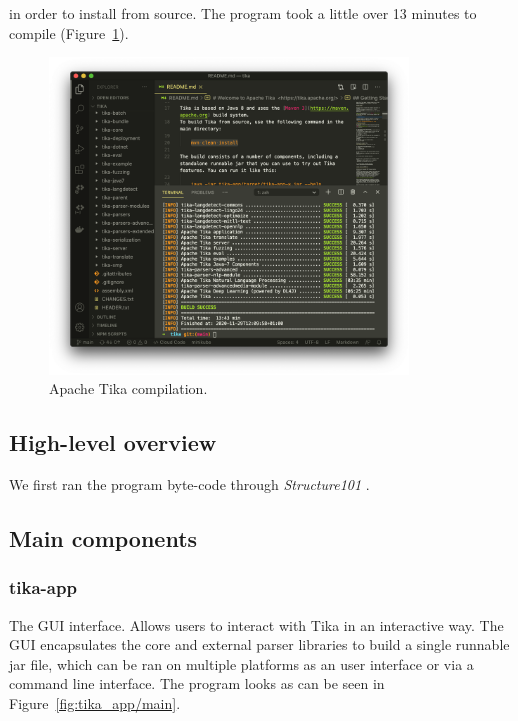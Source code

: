 \documentclass{article}
\begin{document}
in order to install from source. The program took a little over 13 minutes to compile (Figure~\ref{fig:compilation}).

\begin{figure}[ht]
    \centering
    \includegraphics[width=0.85\textwidth]{report/images/compiling-tika.png}
    \caption{Apache Tika compilation.}
    \label{fig:compilation}
\end{figure}

\subsection{High-level overview}
We first ran the program byte-code through \textit{Structure101} \citep{mcnamara_hickey_oreilly_chedgey_2018}.

\subsection{Main components}
\subsubsection{tika-app}
The GUI interface. Allows users to interact with Tika in an interactive way. The GUI encapsulates the core and external parser libraries to build a single runnable jar file, which can be ran on multiple platforms as an user interface or via a command line interface. The program looks as can be seen in Figure~\ref{fig:tika_app/main}.
\end{document}
